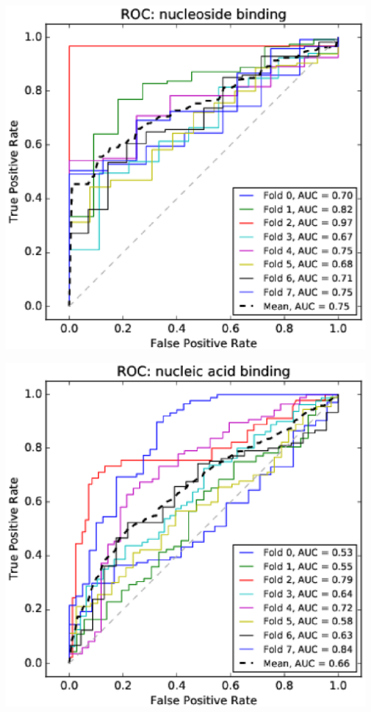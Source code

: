 \documentclass[11pt,twoside,a4paper]{book}
\newenvironment{Figure}
  {\par\medskip\noindent\minipage{\linewidth}}
  {\endminipage\par\medskip}
\begin{document}
\begin{multicols}{2}
\begin{Figure}\begin{center}\includegraphics[width=\linewidth]{figures/roc_nucleoside_binding}\label{fig:roc_nucleoside_binding}\end{center}\end{Figure}
\begin{Figure}\begin{center}\includegraphics[width=\linewidth]{figures/roc_nucleic_acid_binding}\label{fig:roc_nucleic_acid_binding}\end{center}\end{Figure}

\end{multicols}
\end{document}
